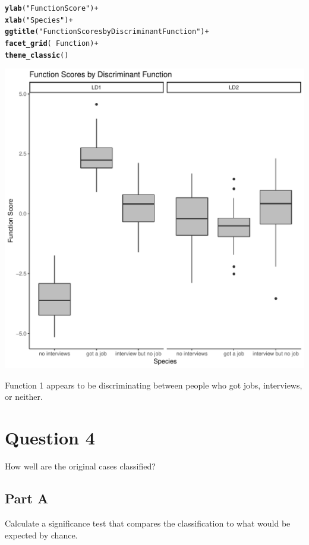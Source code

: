 \documentclass{article}\usepackage[]{graphicx}\usepackage[]{color}
\makeatletter
\def\maxwidth{ %
  \ifdim\Gin@nat@width>\linewidth
    \linewidth
  \else
    \Gin@nat@width
  \fi
}
\newcommand{\hlstr}[1]{\textcolor[rgb]{0.192,0.494,0.8}{#1}}%
\newcommand{\hlopt}[1]{\textcolor[rgb]{0,0,0}{#1}}%
\newcommand{\hlstd}[1]{\textcolor[rgb]{0.345,0.345,0.345}{#1}}%
\newcommand{\hlkwd}[1]{\textcolor[rgb]{0.737,0.353,0.396}{\textbf{#1}}}%
\newenvironment{kframe}{%
 \def\at@end@of@kframe{}%
 \ifinner\ifhmode%
  \def\at@end@of@kframe{\end{minipage}}%
  \begin{minipage}{\columnwidth}%
 \fi\fi%
 \def\FrameCommand##1{\hskip\@totalleftmargin \hskip-\fboxsep
 \colorbox{shadecolor}{##1}\hskip-\fboxsep
     \hskip-\linewidth \hskip-\@totalleftmargin \hskip\columnwidth}%
 \MakeFramed {\advance\hsize-\width
   \@totalleftmargin\z@ \linewidth\hsize
   \@setminipage}}%
 {\par\unskip\endMakeFramed%
 \at@end@of@kframe}
\newenvironment{knitrout}{}{} %
\makeatother
\begin{document}
\begin{knitrout}
\begin{kframe}
\begin{alltt}
  \hlkwd{ylab}\hlstd{(}\hlstr{"Function Score"}\hlstd{)} \hlopt{+}
  \hlkwd{xlab}\hlstd{(}\hlstr{"Species"}\hlstd{)} \hlopt{+}
  \hlkwd{ggtitle}\hlstd{(}\hlstr{"Function Scores by Discriminant Function"}\hlstd{)} \hlopt{+}
  \hlkwd{facet_grid}\hlstd{(}\hlopt{~}\hlstd{Function)} \hlopt{+}
  \hlkwd{theme_classic}\hlstd{()}
\end{alltt}
\end{kframe}
\includegraphics[width=\maxwidth]{figure/unnamed-chunk-5-1} 

\end{knitrout}

Function 1 appears to be discriminating between people who got jobs, interviews, or neither.

\section{Question 4}
How well are the original cases classified?

\subsection{Part A}
Calculate a significance test that compares the classification to what would be expected by chance.
\end{document}
